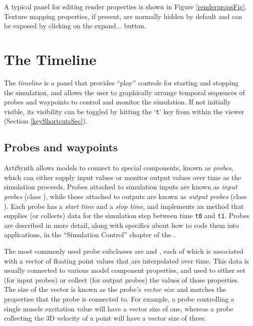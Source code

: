 \documentclass{article}
\begin{document}
A typical panel for editing render properties is shown in Figure
\ref{renderpropsFig}. Texture mapping properties, if present, are
normally hidden by default and can be exposed by clicking on the {\sf
expand...} button.

\section{The Timeline}
\label{TimelineSec}

The {\it timeline} is a panel that provides ``play'' controls for
starting and stopping the simulation, and allows the user to
graphically arrange temporal sequences of probes and waypoints to
control and monitor the simulation. If not initially visible, its
visibility can be toggled by hitting the `{\tt t}' key from within the
viewer (Section \ref{keyShortcutsSec}).

\subsection{Probes and waypoints}
\label{ProbesAndWaypoints:sec}

ArtiSynth allows models to connect to special components, known as
{\it probes}, which can either supply input values or monitor output
values over time as the simulation proceeds. Probes attached to
simulation inputs are known as {\it input probes} (class
), while those attached
to outputs are known as {\it output probes} (class
).  Each probe has a
{\it start time} and a {\it stop time}, and implements an
 method
that supplies (or collects) data for the simulation step between time
{\tt t0} and {\tt t1}.  Probes are described in more detail, along
with specifics about how to code them into applications, in the
``Simulation Control'' chapter of the
.

The most commonly used probe subclasses are
 and
, each of which
is associated with a vector of floating point values that are
interpolated over time. This data is usually connected to various
model component properties, and used to either set (for input probes)
or collect (for output probes) the values of those properties. The
size of the vector is known as the probe's {\it vector size} and
matches the properties that the probe is connected to. For example, a
probe controlling a single muscle excitation value will have a vector
size of one, whereas a probe collecting the 3D velocity of a point
will have a vector size of three.
\end{document}
